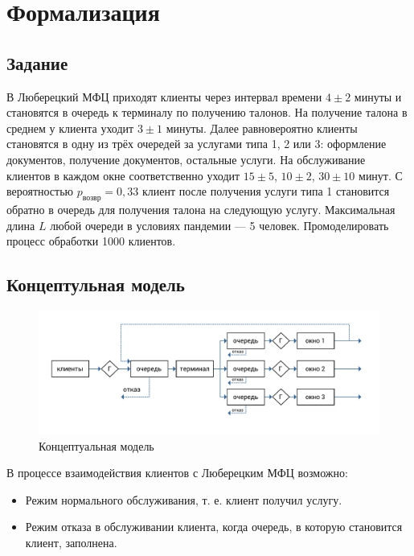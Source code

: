 \documentclass[a4paper,oneside,12pt]{extreport}
\begin{document}


\tableofcontents

\chapter{Формализация}

\section{Задание}

В Люберецкий МФЦ приходят клиенты через интервал времени $4 \pm 2$ минуты и становятся в очередь к терминалу по получению талонов.
На получение талона в среднем у клиента уходит $3 \pm 1$ минуты.
Далее равновероятно клиенты становятся в одну из трёх очередей за услугами типа 1, 2 или 3: оформление документов, получение документов, остальные услуги.
На обслуживание клиентов в каждом окне соответственно уходит $15 \pm 5$, $10 \pm 2$, $30 \pm 10$ минут.
С вероятностью $p_{\text{возвр}} = 0,33$ клиент после получения услуги типа 1 становится обратно в очередь для получения талона на следующую услугу.
Максимальная длина $L$ любой очереди в условиях пандемии — 5 человек.
Промоделировать процесс обработки 1000 клиентов.

\section{Концептульная модель}

\begin{figure}[H]
	\centering
	\includegraphics[width=0.9\linewidth]{inc/img/conceptual-model.pdf}
	\caption{Концептуальная модель}
	\label{conceptual-model-qt}
\end{figure}

В процессе взаимодействия клиентов с Люберецким МФЦ возможно:
\begin{itemize}
	\item Режим нормального обслуживания, т. е. клиент получил услугу.
	\item Режим отказа в обслуживании клиента, когда очередь, в которую становится клиент, заполнена.
\end{itemize}
\end{document}
